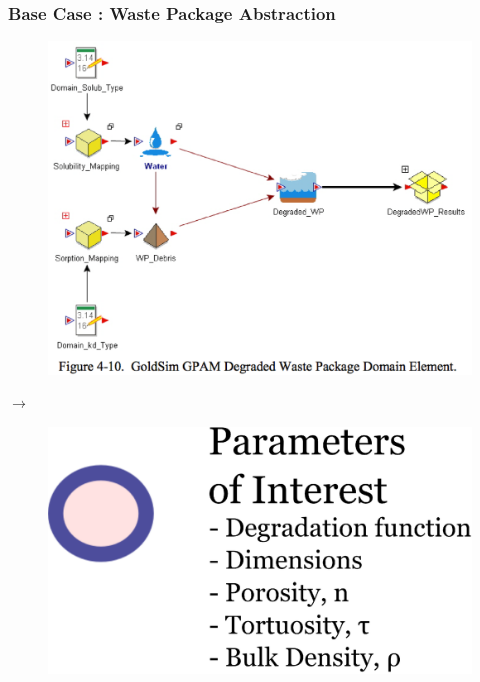 \begin{frame}[ctb!]
  \frametitle{Base Case : Waste Package Abstraction}
  \begin{minipage}{0.45\textwidth}
    \begin{figure}[h!]
      \begin{center}
        \includegraphics[width=\textwidth]{./images/wp.eps}
      \end{center}
    \end{figure}
  \end{minipage}
  \hspace{0.01cm}\large{$\rightarrow$}\hspace{0.01cm}
  \begin{minipage}{0.45\textwidth}
    \begin{figure}[h!]
      \begin{center}
        \includegraphics[width=\textwidth]{./images/abstractionWP.eps}
      \end{center}
    \end{figure}
  \end{minipage}
\end{frame}

